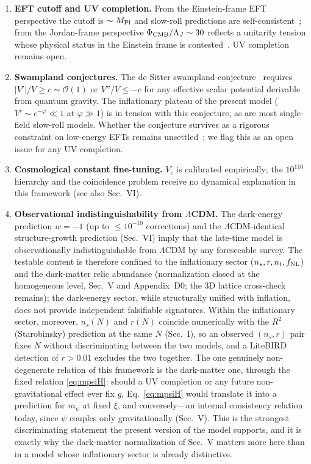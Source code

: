 \documentclass[pdflatex,sn-mathphys-num]{sn-jnl}
\newcommand{\MP}{M_{\rm Pl}}
\theoremstyle{thmstyleone}
\begin{document}
\begin{enumerate}
\item \textbf{EFT cutoff and UV completion.} From the Einstein-frame EFT perspective the cutoff is $\sim\MP$ and slow-roll predictions are self-consistent~\cite{Bezrukov2008}; from the Jordan-frame perspective $\Phi_{\rm CMB}/\Lambda_J\sim30$ reflects a unitarity tension whose physical status in the Einstein frame is contested~\cite{Burgess2009,Burgess2010,Flanagan2004}. UV completion remains open.

\item \textbf{Swampland conjectures.} The de Sitter swampland conjecture~\cite{Obied2018} requires $|V'|/V\geq c\sim\mathcal{O}(1)$ or $V''/V\leq-c$ for any effective scalar potential derivable from quantum gravity. The inflationary plateau of the present model ($V'\sim e^{-\varphi}\ll1$ at $\varphi\gg1$) is in tension with this conjecture, as are most single-field slow-roll models. Whether the conjecture survives as a rigorous constraint on low-energy EFTs remains unsettled~\cite{Akrami2019}; we flag this as an open issue for any UV completion.

\item \textbf{Cosmological constant fine-tuning.} $V_c$ is calibrated empirically; the $10^{110}$ hierarchy and the coincidence problem receive no dynamical explanation in this framework (see also Sec.~VI).

\item \textbf{Observational indistinguishability from $\Lambda$CDM.} The dark-energy prediction $w=-1$ (up to $\leq10^{-10}$ corrections) and the $\Lambda$CDM-identical structure-growth prediction (Sec.~VI) imply that the late-time model is observationally indistinguishable from $\Lambda$CDM by any foreseeable survey. The testable content is therefore confined to the inflationary sector ($n_s,r,n_t,f_{\rm NL}$) and the dark-matter relic abundance (normalization closed at the homogeneous level, Sec.~V and Appendix~D0; the 3D lattice cross-check remains); the dark-energy sector, while structurally unified with inflation, does not provide independent falsifiable signatures. Within the inflationary sector, moreover, $n_s(N)$ and $r(N)$ coincide numerically with the $R^2$ (Starobinsky) prediction at the same $N$ (Sec.~I), so an observed $(n_s,r)$ pair fixes $N$ without discriminating between the two models, and a LiteBIRD detection of $r>0.01$ excludes the two together. The one genuinely non-degenerate relation of this framework is the dark-matter one, through the fixed relation \eqref{eq:mpsiH}: should a UV completion or any future non-gravitational effect ever fix $g$, Eq.~\eqref{eq:mpsiH} would translate it into a prediction for $m_\psi$ at fixed $\xi$, and conversely---an internal consistency relation today, since $\psi$ couples only gravitationally (Sec.~V). This is the strongest discriminating statement the present version of the model supports, and it is exactly why the dark-matter normalization of Sec.~V matters more here than in a model whose inflationary sector is already distinctive.


\end{enumerate}
\end{document}
